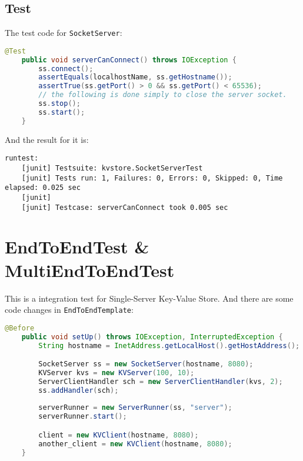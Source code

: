 \documentclass{article}
\begin{document}
\subsection{Test}
The test code for \texttt{SocketServer}:
\begin{lstlisting}[language=java]
    @Test
    public void serverCanConnect() throws IOException {
        ss.connect();
        assertEquals(localhostName, ss.getHostname());
        assertTrue(ss.getPort() > 0 && ss.getPort() < 65536);
        // the following is done simply to close the server socket.
        ss.stop();
        ss.start();
    }
\end{lstlisting}
And the result for it is:
\begin{lstlisting}
runtest:
    [junit] Testsuite: kvstore.SocketServerTest
    [junit] Tests run: 1, Failures: 0, Errors: 0, Skipped: 0, Time elapsed: 0.025 sec
    [junit] 
    [junit] Testcase: serverCanConnect took 0.005 sec
\end{lstlisting}
\section{EndToEndTest & MultiEndToEndTest}
This is a integration test for Single-Server Key-Value Store. And there are some code changes in \texttt{EndToEndTemplate}:
\begin{lstlisting}[language=java]
    @Before
    public void setUp() throws IOException, InterruptedException {
        String hostname = InetAddress.getLocalHost().getHostAddress();

        SocketServer ss = new SocketServer(hostname, 8080);
        KVServer kvs = new KVServer(100, 10);
        ServerClientHandler sch = new ServerClientHandler(kvs, 2); 
        ss.addHandler(sch);
        
        serverRunner = new ServerRunner(ss, "server");
        serverRunner.start();

        client = new KVClient(hostname, 8080);
        another_client = new KVClient(hostname, 8080);
    }
\end{lstlisting}
\end{document}
